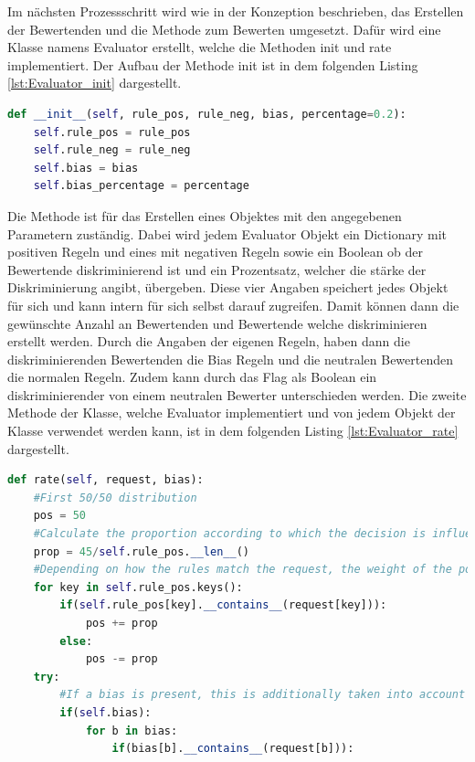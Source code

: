 \begin{onehalfspace}
Im nächsten Prozessschritt wird wie in der Konzeption beschrieben, das Erstellen der Bewertenden und die Methode zum Bewerten umgesetzt. Dafür wird eine Klasse namens \glqq{}Evaluator\grqq{} erstellt, welche die Methoden \glqq{}init\grqq{} und \glqq{}rate\grqq{} implementiert. Der Aufbau der Methode \glqq{}init\grqq{} ist in dem folgenden Listing \ref{lst:Evaluator_init} dargestellt.
\begin{lstlisting}[language=Python,label={lst:Evaluator_init},caption=Methode zur Initialisierung eines Bewertenden]
def __init__(self, rule_pos, rule_neg, bias, percentage=0.2):
    self.rule_pos = rule_pos
    self.rule_neg = rule_neg
    self.bias = bias
    self.bias_percentage = percentage
\end{lstlisting}
Die Methode ist für das Erstellen eines Objektes mit den angegebenen Parametern zuständig. Dabei wird jedem \glqq{}Evaluator\grqq{} Objekt ein Dictionary mit positiven Regeln und eines mit negativen Regeln sowie ein Boolean ob der Bewertende diskriminierend ist und ein Prozentsatz, welcher die stärke der Diskriminierung angibt, übergeben. Diese vier Angaben speichert jedes Objekt für sich und kann intern für sich selbst darauf zugreifen. Damit können dann die gewünschte Anzahl an Bewertenden und Bewertende welche diskriminieren erstellt werden. Durch die Angaben der eigenen Regeln, haben dann die diskriminierenden Bewertenden die Bias Regeln und die neutralen Bewertenden die normalen Regeln. Zudem kann durch das Flag als Boolean ein diskriminierender von einem neutralen Bewerter unterschieden werden.
Die zweite Methode der Klasse, welche \glqq{}Evaluator\grqq{} implementiert und von jedem Objekt der Klasse verwendet werden kann, ist in dem folgenden Listing \ref{lst:Evaluator_rate} dargestellt.
\begin{lstlisting}[language=Python,label={lst:Evaluator_rate},caption=Methode eines Bewertenden zum Bewerten von Anträgen]
def rate(self, request, bias):
    #First 50/50 distribution
    pos = 50
    #Calculate the proportion according to which the decision is influenced positively or negatively.
    prop = 45/self.rule_pos.__len__()
    #Depending on how the rules match the request, the weight of the positive evaluation is shifted.
    for key in self.rule_pos.keys():
        if(self.rule_pos[key].__contains__(request[key])):
            pos += prop
        else:
            pos -= prop
    try:
        #If a bias is present, this is additionally taken into account with the Parameter in %
        if(self.bias):
            for b in bias:
                if(bias[b].__contains__(request[b])):

\end{lstlisting}
\end{onehalfspace}
